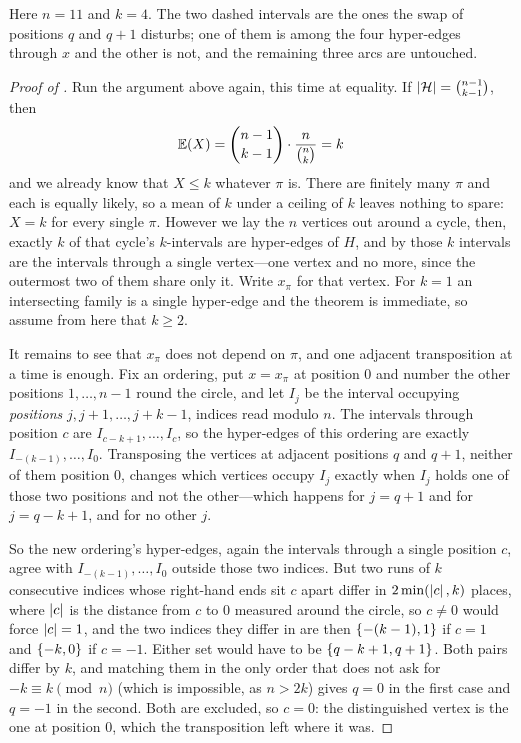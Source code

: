 Here $n = 11$ and $k = 4$. The two dashed intervals are the ones the swap of positions $q$ and $q + 1$ disturbs; one of them is among the four hyper-edges through $x$ and the other is not, and the remaining three arcs are untouched.

\begin{proof}[Proof of ]
    Run the argument above again, this time at equality. If $\left\lvert \mathcal{H} \right\rvert = \binom{n-1}{k-1}$, then
    \begin{align*}
        \mathbb{E}\!\left( X \right) = \binom{n-1}{k-1} \cdot \frac{n}{\binom{n}{k}} = k
    \end{align*}
    and we already know that $X \leq k$ whatever $\pi$ is. There are finitely many $\pi$ and each is equally likely, so a mean of $k$ under a ceiling of $k$ leaves nothing to spare: $X = k$ for every single $\pi$. However we lay the $n$ vertices out around a cycle, then, exactly $k$ of that cycle's $k$-intervals are hyper-edges of $H$, and by  those $k$ intervals are the intervals through a single vertex---one vertex and no more, since the outermost two of them share only it. Write $x_{\pi}$ for that vertex. For $k = 1$ an intersecting family is a single hyper-edge and the theorem is immediate, so assume from here that $k \geq 2$.

    It remains to see that $x_{\pi}$ does not depend on $\pi$, and one adjacent transposition at a time is enough. Fix an ordering, put $x = x_{\pi}$ at position $0$ and number the other positions $1, \ldots, n - 1$ round the circle, and let $I_j$ be the interval occupying \emph{positions} $j, j + 1, \ldots, j + k - 1$, indices read modulo $n$. The intervals through position $c$ are $I_{c-k+1}, \ldots, I_{c}$, so the hyper-edges of this ordering are exactly $I_{-(k-1)}, \ldots, I_{0}$. Transposing the vertices at adjacent positions $q$ and $q + 1$, neither of them position $0$, changes which vertices occupy $I_j$ exactly when $I_j$ holds one of those two positions and not the other---which happens for $j = q + 1$ and for $j = q - k + 1$, and for no other $j$.

    So the new ordering's hyper-edges, again the intervals through a single position $c$, agree with $I_{-(k-1)}, \ldots, I_{0}$ outside those two indices. But two runs of $k$ consecutive indices whose right-hand ends sit $c$ apart differ in $2\min\!\left( \left\lvert c \right\rvert, k \right)$ places, where $\left\lvert c \right\rvert$ is the distance from $c$ to $0$ measured around the circle, so $c \neq 0$ would force $\left\lvert c \right\rvert = 1$, and the two indices they differ in are then $\left\{ -(k-1), 1 \right\}$ if $c = 1$ and $\left\{ -k, 0 \right\}$ if $c = -1$. Either set would have to be $\left\{ q - k + 1, q + 1 \right\}$. Both pairs differ by $k$, and matching them in the only order that does not ask for $-k \equiv k \pmod{n}$ (which is impossible, as $n > 2k$) gives $q = 0$ in the first case and $q = -1$ in the second. Both are excluded, so $c = 0$: the distinguished vertex is the one at position $0$, which the transposition left where it was.


\end{proof}
